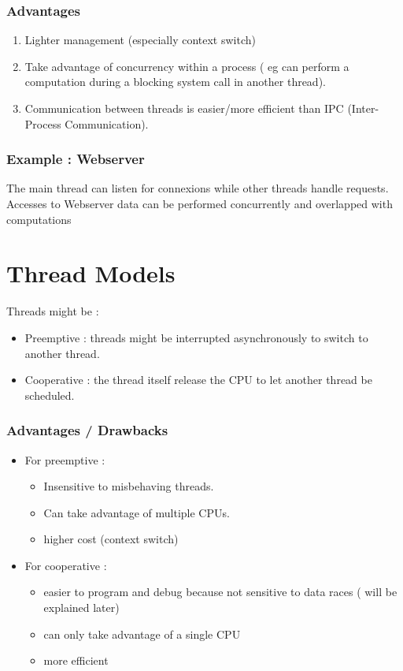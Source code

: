 \documentclass[a4paper,10pt]{article}
\begin{document}
\subsubsection*{Advantages}
\begin{enumerate}[label=-]
	\item Lighter management (especially context switch)
	\item Take advantage of concurrency within a process ( eg can perform a computation during a blocking system call in another thread).
	\item Communication between threads is easier/more efficient than IPC (Inter-Process Communication).
\end{enumerate}

\subsubsection*{Example : Webserver}
The main thread can listen for connexions while other threads handle requests.
Accesses to Webserver data can be performed concurrently and overlapped with computations

\section{Thread Models}

Threads might be :
\begin{itemize}
\item Preemptive : threads might be interrupted asynchronously to switch to another thread. 
\item Cooperative : the thread itself release the CPU to let another thread be scheduled.
\end{itemize}

\subsubsection*{Advantages / Drawbacks}

\begin{itemize}
 \item For preemptive :
\begin{itemize} 
\item Insensitive to misbehaving threads.
\item Can take advantage of multiple CPUs.
\item higher cost (context switch) 
\end{itemize}

\item For cooperative :
 \begin{itemize}
 
\item easier to program and debug  because not sensitive to data races ( will be explained later) 
\item can only take advantage of a single CPU 
\item more efficient
\end{itemize}
\end{itemize}
\end{document}
